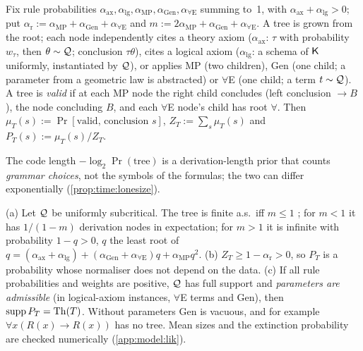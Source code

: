 \begin{definition}\label{def:model:lone}
Fix rule probabilities $\alpha_{\mathrm{ax}},\alpha_{\mathrm{lg}},\alpha_{\mathrm{MP}},\alpha_{\mathrm{Gen}},\alpha_{\forall\mathrm E}$ summing to~1, with $\alpha_{\mathrm{ax}}+\alpha_{\mathrm{lg}}>0$; put $\alpha_{\mathrm r}:=\alpha_{\mathrm{MP}}+\alpha_{\mathrm{Gen}}+\alpha_{\forall\mathrm E}$ and $m:=2\alpha_{\mathrm{MP}}+\alpha_{\mathrm{Gen}}+\alpha_{\forall\mathrm E}$. A tree is grown from the root; each node independently
cites a theory axiom ($\alpha_{\mathrm{ax}}$: $\tau$ with probability $w_\tau$, then $\theta\sim\mathcal{Q}$; conclusion $\tau\theta$),
cites a logical axiom ($\alpha_{\mathrm{lg}}$: a schema of $\mathsf{K}$ uniformly, instantiated by $\mathcal{Q}$),
or applies MP (two children), Gen (one child; a parameter from a geometric law is abstracted) or $\forall$E (one child; a term $t\sim\mathcal{Q}$).
A tree is \emph{valid} if at each MP node the right child concludes (left conclusion $\to B$), the node concluding $B$, and each $\forall$E node's child has root $\forall$. Then $\mu_T(s):=\Pr[\text{valid, conclusion }s]$, $Z_T:=\sum_s\mu_T(s)$ and $P_T(s):=\mu_T(s)/Z_T$.
\end{definition}

The code length $-\log_2\Pr(\text{tree})$ is a derivation-length prior that counts \emph{grammar choices}, not the symbols of the formulas; the two can differ exponentially (\cref{prop:time:lonesize}).

\begin{lemma}\label{lem:model:lone}
(a) Let $\mathcal{Q}$ be uniformly subcritical. The tree is finite a.s.\ iff $m\le1$ \citep[Ch.~I; numbering not checked]{athreya1972branching}; for $m<1$ it has $1/(1-m)$ derivation nodes in expectation; for $m>1$ it is infinite with probability $1-q>0$, $q$ the least root of $q=(\alpha_{\mathrm{ax}}+\alpha_{\mathrm{lg}})+(\alpha_{\mathrm{Gen}}+\alpha_{\forall\mathrm E})q+\alpha_{\mathrm{MP}}q^2$.
(b) $Z_T\ge1-\alpha_{\mathrm r}>0$, so $P_T$ is a probability whose normaliser does not depend on the data.
(c) If all rule probabilities and weights are positive, $\mathcal{Q}$ has full support and \emph{parameters are admissible} (in logical-axiom instances, $\forall$E terms and Gen), then $\operatorname{supp}P_T=\mathrm{Th}(T)$. Without parameters Gen is vacuous, and for example $\forall x(R(x)\to R(x))$ has no tree. Mean sizes and the extinction probability are checked numerically (\cref{app:model:lik}).
\end{lemma}

